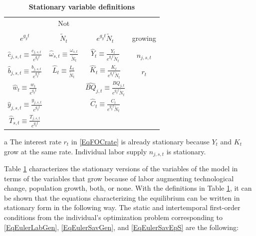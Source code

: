 \documentclass[letterpaper,12pt]{article}
\theoremstyle{definition}
\begin{document}
\begin{spacing}{1.5}
    \begin{table}[htbp] \centering \captionsetup{width=3.3in}
    \caption{\label{TabStatVars}\textbf{Stationary variable definitions}}
      \begin{threeparttable}
      \begin{tabular}{>{\small}c >{\small}c >{\small}c |>{\small}c}
        \hline\hline
        \multicolumn{3}{c}{Sources of growth} & Not \\
        & & & \\[-4mm]
        $e^{g_y t}$ & $\tilde{N}_t$ & $e^{g_y t}\tilde{N}_t$ & growing\tnote{a} \\
        \hline
        & & \\[-4mm]
        $\hat{c}_{j,s,t}\equiv\frac{c_{j,s,t}}{e^{g_y t}}$ & $\hat{\omega}_{s,t}\equiv\frac{\omega_{s,t}}{\tilde{N}_t}$ & $\hat{Y}_t\equiv\frac{Y_t}{e^{g_y t}\tilde{N}_t}$ & $n_{j,s,t}$ \\[2mm]
        $\hat{b}_{j,s,t}\equiv\frac{b_{j,s,t}}{e^{g_y t}}$ & $\hat{L}_t\equiv\frac{L_t}{\tilde{N}_t}$ & $\hat{K}_t\equiv\frac{K_t}{e^{g_y t}\tilde{N}_t}$ & $r_t$ \\[2mm]
        $\hat{w}_t\equiv\frac{w_t}{e^{g_y t}}$ &  & $\hat{BQ}_{j,t}\equiv\frac{BQ_{j,t}}{e^{g_y t}\tilde{N}_t}$ &  \\[2mm]
        $\hat{y}_{j,s,t}\equiv\frac{y_{j,s,t}}{e^{g_y t}}$ &  & $\hat{C}_t\equiv \frac{C_t}{e^{g_y t}\tilde{N}_t}$  &  \\[2mm]
        $\hat{T}_{s,t}\equiv\frac{T_{j,s,t}}{e^{g_y t}}$ &  &  &  \\[2mm]
        \hline\hline
      \end{tabular}
      \begin{tablenotes}
        \scriptsize{\item[a]The interest rate $r_t$ in \eqref{EqFOCrate} is already stationary because $Y_t$ and $K_t$ grow at the same rate. Individual labor supply $n_{j,s,t}$ is stationary.}
      \end{tablenotes}
      \end{threeparttable}
    \end{table}

    Table \ref{TabStatVars} characterizes the stationary versions of the variables of the model in terms of the variables that grow because of labor augmenting technological change, population growth, both, or none. With the definitions in Table \ref{TabStatVars}, it can be shown that the equations  characterizing the equilibrium can be written in stationary form in the following way. The static and intertemporal first-order conditions from the individual's optimization problem corresponding to \eqref{EqEulerLabGen}, \eqref{EqEulerSavGen}, and \eqref{EqEulerSavEpS} are the following:


\end{spacing}
\end{document}
